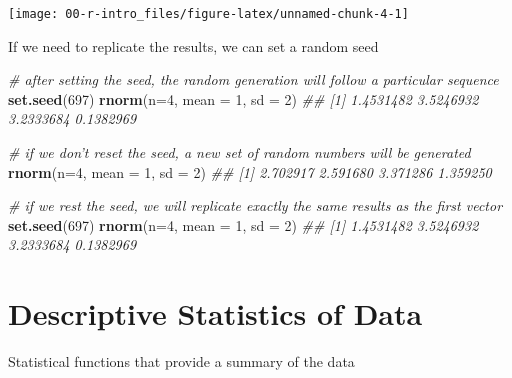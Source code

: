 \documentclass[
]{article}
\newenvironment{Shaded}{\begin{snugshade}}{\end{snugshade}}
\newcommand{\CommentTok}[1]{\textcolor[rgb]{0.56,0.35,0.01}{\textit{#1}}}
\newcommand{\DataTypeTok}[1]{\textcolor[rgb]{0.13,0.29,0.53}{#1}}
\newcommand{\DecValTok}[1]{\textcolor[rgb]{0.00,0.00,0.81}{#1}}
\newcommand{\KeywordTok}[1]{\textcolor[rgb]{0.13,0.29,0.53}{\textbf{#1}}}
\newcommand{\NormalTok}[1]{#1}
\begin{document}
\begin{center}\texttt{[image: 00-r-intro\_files/figure-latex/unnamed-chunk-4-1]} \end{center}

\vspace{12pt}

If we need to replicate the results, we can set a random seed

\begin{Shaded}
\begin{Highlighting}[]
    \CommentTok{# after setting the seed, the random generation will follow a particular sequence}
    \KeywordTok{set.seed}\NormalTok{(}\DecValTok{697}\NormalTok{)}
    \KeywordTok{rnorm}\NormalTok{(}\DataTypeTok{n=}\DecValTok{4}\NormalTok{, }\DataTypeTok{mean =} \DecValTok{1}\NormalTok{, }\DataTypeTok{sd =} \DecValTok{2}\NormalTok{)}
\CommentTok{## [1] 1.4531482 3.5246932 3.2333684 0.1382969}
    
    \CommentTok{# if we don't reset the seed, a new set of random numbers will be generated }
    \KeywordTok{rnorm}\NormalTok{(}\DataTypeTok{n=}\DecValTok{4}\NormalTok{, }\DataTypeTok{mean =} \DecValTok{1}\NormalTok{, }\DataTypeTok{sd =} \DecValTok{2}\NormalTok{)}
\CommentTok{## [1] 2.702917 2.591680 3.371286 1.359250}
    
    \CommentTok{# if we rest the seed, we will replicate exactly the same results as the first vector}
    \KeywordTok{set.seed}\NormalTok{(}\DecValTok{697}\NormalTok{)}
    \KeywordTok{rnorm}\NormalTok{(}\DataTypeTok{n=}\DecValTok{4}\NormalTok{, }\DataTypeTok{mean =} \DecValTok{1}\NormalTok{, }\DataTypeTok{sd =} \DecValTok{2}\NormalTok{)}
\CommentTok{## [1] 1.4531482 3.5246932 3.2333684 0.1382969}
\end{Highlighting}
\end{Shaded}

\hypertarget{descriptive-statistics-of-data}{%
\section{Descriptive Statistics of
Data}\label{descriptive-statistics-of-data}}

\vspace{12pt}

Statistical functions that provide a summary of the data
\end{document}
